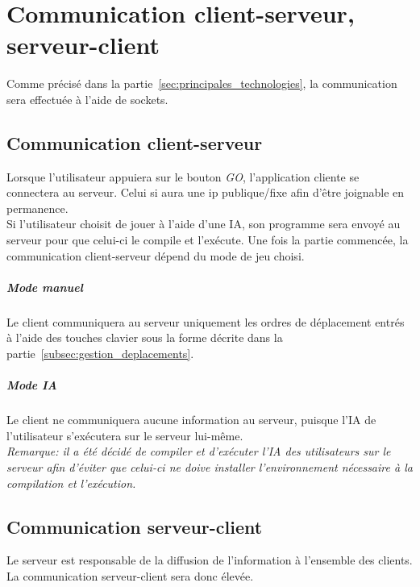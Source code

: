 \chapter{Communication client-serveur, serveur-client}
    Comme précisé dans la partie~\ref{sec:principales_technologies}, la communication sera effectuée à l'aide de sockets.


    \section{Communication client-serveur}
        Lorsque l'utilisateur appuiera sur le bouton \emph{GO}, l'application cliente se connectera au serveur. Celui si aura une ip publique/fixe afin d'être joignable en permanence.\\

        Si l'utilisateur choisit de jouer à l'aide d'une IA, son programme sera envoyé au serveur pour que celui-ci le compile et l'exécute. Une fois la partie commencée, la communication client-serveur dépend du mode de jeu choisi.

        \paragraph{Mode manuel} Le client communiquera au serveur uniquement les ordres de déplacement entrés à l'aide des touches clavier sous la forme décrite dans la partie~\ref{subsec:gestion_deplacements}.

        \paragraph{Mode IA} Le client ne communiquera aucune information au serveur, puisque l'IA de l'utilisateur s'exécutera sur le serveur lui-même. \\

        \emph{Remarque: il a été décidé de compiler et d'exécuter l'IA des utilisateurs sur le serveur afin d'éviter que celui-ci ne doive installer l'environnement nécessaire à la compilation et l'exécution.}


    \section{Communication serveur-client}
        Le serveur est responsable de la diffusion de l'information à l'ensemble des clients. La communication serveur-client sera donc élevée. \\

